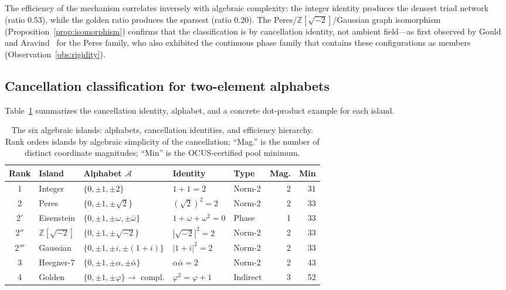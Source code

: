 \documentclass[12pt,a4paper]{article}
\newcommand{\Z}{\mathbb{Z}}
\begin{document}
The efficiency of the mechanism correlates inversely with algebraic complexity: the integer identity produces the densest triad network (ratio 0.53), while the golden ratio produces the sparsest (ratio 0.20).  The Peres/$\Z[\sqrt{-2}]$/Gaussian graph isomorphism (Proposition~\ref{prop:isomorphism}) confirms that the classification is by cancellation identity, not ambient field---as first observed by Gould and Aravind~\cite{GouldAravind2010} for the Peres family, who also exhibited the continuous phase family that contains these configurations as members (Observation~\ref{obs:rigidity}).

\subsection{Cancellation classification for two-element alphabets}\label{sec:completeness}

Table~\ref{tab:cancellation} summarizes the cancellation identity, alphabet, and a concrete dot-product example for each island.

\begin{table}[t]
\centering
\caption{The six algebraic islands: alphabets, cancellation identities, and efficiency hierarchy. Rank orders islands by algebraic simplicity of the cancellation; ``Mag.'' is the number of distinct coordinate magnitudes; ``Min'' is the OCUS-certified pool minimum.}
\label{tab:cancellation}
\footnotesize
\setlength{\tabcolsep}{4pt}
\begin{tabular}{@{}cllllrr@{}}
\toprule
Rank & Island & Alphabet $\mathcal{A}$ & Identity & Type & Mag. & Min \\
\midrule
1 & Integer & $\{0,\pm 1,\pm 2\}$ & $1 + 1 = 2$ & Norm-2 & 2 & 31 \\
2 & Peres & $\{0,\pm 1,\pm\!\sqrt{2}\}$ & $(\sqrt{2})^2 = 2$ & Norm-2 & 2 & 33 \\
2$'$ & Eisenstein & $\{0,\pm 1,\pm\omega,\pm\bar\omega\}$ & $1 + \omega + \omega^2 = 0$ & Phase & 1 & 33 \\
2$''$ & $\Z[\sqrt{-2}]$ & $\{0,\pm 1,\pm\!\sqrt{-2}\}$ & $|\sqrt{-2}|^2 = 2$ & Norm-2 & 2 & 33 \\
2$'''$ & Gaussian & $\{0,\pm 1,\pm i,\pm(1{+}i)\}$ & $|1{+}i|^2 = 2$ & Norm-2 & 2 & 33 \\
3 & Heegner-7 & $\{0,\pm 1,\pm\alpha,\pm\bar\alpha\}$ & $\alpha\bar\alpha = 2$ & Norm-2 & 2 & 43 \\
4 & Golden & $\{0,\pm 1,\pm\varphi\} \to$ compl. & $\varphi^2 = \varphi + 1$ & Indirect & 3 & 52 \\
\bottomrule
\end{tabular}
\end{table}
\end{document}
